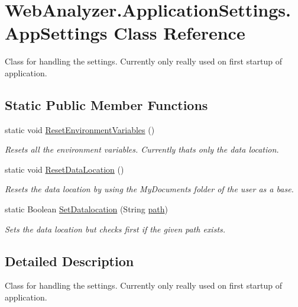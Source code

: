 \hypertarget{class_web_analyzer_1_1_application_settings_1_1_app_settings}{}\section{Web\+Analyzer.\+Application\+Settings.\+App\+Settings Class Reference}
\label{class_web_analyzer_1_1_application_settings_1_1_app_settings}


Class for handling the settings. Currently only really used on first startup of application.  


\subsection*{Static Public Member Functions}
\begin{DoxyCompactItemize}
\item 
static void \hyperlink{class_web_analyzer_1_1_application_settings_1_1_app_settings_a1f60a3d031a0fa24200c06415d11b3b6}{Reset\+Environment\+Variables} ()
\begin{DoxyCompactList}\small\item\em Resets all the environment variables. Currently thats only the data location. \end{DoxyCompactList}\item 
static void \hyperlink{class_web_analyzer_1_1_application_settings_1_1_app_settings_aeb29103a92e6fbf8bd6be79de2294099}{Reset\+Data\+Location} ()
\begin{DoxyCompactList}\small\item\em Resets the data location by using the My\+Documents folder of the user as a base. \end{DoxyCompactList}\item 
static Boolean \hyperlink{class_web_analyzer_1_1_application_settings_1_1_app_settings_a3c885c79ecd2a5c3a47acfa26576101a}{Set\+Datalocation} (String \hyperlink{bin_2x64_2_release_2_u_i_2_h_t_m_l_resources_2js_2src_2create__experiment_8js_aa72e0c8a20e6bcc571d3a1c51846e627}{path})
\begin{DoxyCompactList}\small\item\em Sets the data location but checks first if the given path exists. \end{DoxyCompactList}\end{DoxyCompactItemize}


\subsection{Detailed Description}
Class for handling the settings. Currently only really used on first startup of application. 



